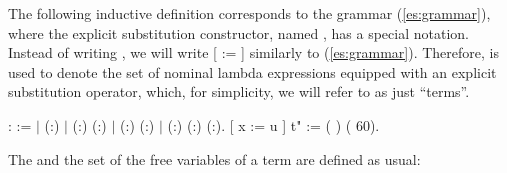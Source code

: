 The following inductive definition corresponds to the grammar (\ref{es:grammar}), where the explicit substitution constructor, named , has a special notation. Instead of writing    , we will write [ := ]  similarly to (\ref{es:grammar}). Therefore,  is used to denote the set of nominal lambda expressions equipped with an explicit substitution operator, which, for simplicity, we will refer to as just ``terms''. 
\begin{coqdoccode}
\coqdocemptyline
\coqdocnoindent
{}  :  :=\coqdoceol
\coqdocindent{0.50em}
\ensuremath{|}  (:)\coqdoceol
\coqdocindent{0.50em}
\ensuremath{|}  (:) (:)\coqdoceol
\coqdocindent{0.50em}
\ensuremath{|}  (:) (:)\coqdoceol
\coqdocindent{0.50em}
\ensuremath{|}  (:) (:) (:).\coqdoceol
\coqdocnoindent
{} [ x := u ] t" := (   ) (  60).\coqdoceol
\coqdocemptyline
\end{coqdoccode}
The  and the set  of the free variables of a term are defined as usual: 
